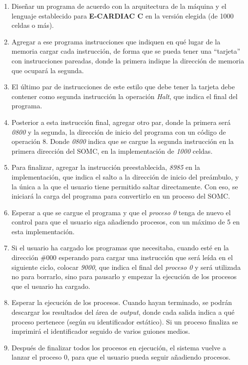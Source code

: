 \documentclass[letterpaper,12pt,oneside]{book}
\begin{document}
			\begin{enumerate}

				\item Diseñar un programa de acuerdo con la arquitectura de la máquina y el lenguaje establecido para \textbf{E-CARDIAC C} en
				la versión elegida (de 1000 celdas o más).
				\item Agregar a ese programa instrucciones que indiquen en qué lugar de la memoria cargar cada instrucción, de forma que se pueda tener
				una ``tarjeta'' con instrucciones pareadas, donde la primera indique la dirección de memoria que ocupará la segunda.
				\item El último par de instrucciones de este estilo que debe tener la tarjeta debe contener como segunda instrucción
				la operación \textit{Halt}, que indica el final del programa.
				\item Posterior a esta instrucción final, agregar otro par, donde la primera será \textit{0800} y la segunda, la dirección de inicio del
				programa con un código de operación 8. Donde \textit{0800} indica que se cargue la segunda instrucción 
				en la primera dirección del SOMC, en
				la implementación de \textit{1000} celdas.
				\item Para finalizar, agregar la instrucción preestablecida, \textit{8985} en la implementación, que indica el salto a la dirección de 
				inicio del preámbulo, y
				la única a la que el usuario tiene permitido saltar directamente. Con eso, se iniciará la carga del programa para convertirlo en
				un proceso del SOMC.
				\item Esperar a que se cargue el programa y que el \textit{proceso 0} 
				tenga de nuevo el control para que el usuario siga añadiendo procesos, con 
				un
				máximo de 5 en esta implementación.
				\item Si el usuario ha cargado los programas que necesitaba, cuando esté en la dirección \#000 esperando para cargar una instrucción
				que será leída en el siguiente ciclo, colocar \textit{9000}, que indica el final del \textit{proceso 0} 
				y será utilizada no para borrarlo,
				sino para pausarlo y empezar la ejecución de los procesos que el usuario ha cargado.
				\item Esperar la ejecución de los procesos. Cuando hayan terminado, se podrán
				 descargar los resultados del área de \textit{output}, donde
				cada salida indica a qué proceso pertenece (según su identificador estático). Si un proceso finaliza se imprimirá el identificador
				seguido de varios guiones medios.
				\item Después de finalizar todos los procesos en ejecución, el sistema vuelve a lanzar el proceso 0, para que el usuario pueda
				seguir añadiendo procesos.
				
			\end{enumerate}
			
\end{document}
